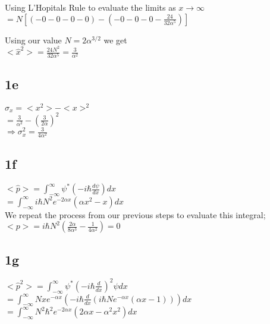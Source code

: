 \documentclass{article}
\begin{document}
Using L'Hopitals Rule to evaluate the limits as $x\rightarrow\infty$\\

$=N[(-0-0-0-0)-(-0-0-0-\frac{24}{32\alpha^5})]$

Using our value $N=2\alpha^{3/2}$ we get \\

$<\hat{x}^2>=\frac{24N^2}{32\alpha^5}=\frac{3}{\alpha^2}$\\

\subsection*{1e}

$\sigma_x=<x^2>-<x>^2$\\

$=\frac{3}{\alpha^2}-(\frac{3}{2\alpha})^2$\\

$\Rightarrow\sigma_x^2=\frac{3}{4\alpha^2}$\\

\subsection*{1f}

$<\hat{p}>=\int_{-\infty}^{\infty}\psi^*(-i\hbar\frac{d\psi}{dx})dx$\\


$=\int_{-\infty}^{\infty}i\hbar N^2e^{-2\alpha x}(\alpha x^2-x)dx$\\

We repeat the process from our previous steps to evaluate this integral;\\

$<p>=i\hbar N^2(\frac{2\alpha}{8\alpha^3}-\frac{1}{4\alpha^2})=0$\\

\subsection*{1g}

$<\hat{p}^2>=\int_{-\infty}^{\infty}\psi^*(-i\hbar\frac{d}{dx})^2\psi dx$\\


$=\int_{-\infty}^{\infty}Nxe^{-\alpha x}(-i\hbar\frac{d}{dx}(i\hbar Ne^{-\alpha x}(\alpha x-1)))dx$\\

$=\int_{-\infty}^{\infty}N^2\hbar^2e^{-2\alpha x}(2\alpha x-\alpha^2x^2)dx$\\
\end{document}
